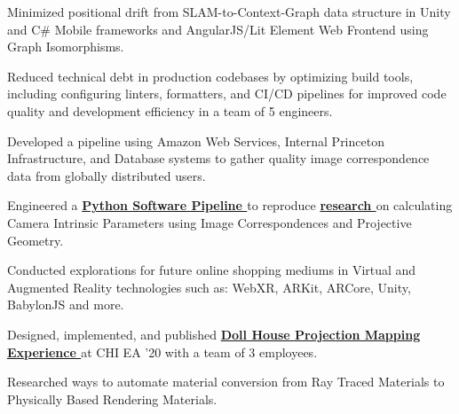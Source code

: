 \documentclass[]{plushcv}
\begin{document}
\begin{minipage}[t]{0.70\textwidth}
    \begin{tightemize}
        \item Minimized positional drift from SLAM-to-Context-Graph data structure in Unity and C\# Mobile frameworks and AngularJS/Lit Element Web Frontend using Graph Isomorphisms.
        \item Reduced technical debt in production codebases by optimizing build tools, including configuring linters, formatters, and CI/CD pipelines for improved code quality and development efficiency in a team of 5 engineers.              
    \end{tightemize}
    \sectionsep

    \begin{tightemize}
        \sectionsep
        \item Developed a pipeline using Amazon Web Services, Internal Princeton Infrastructure, and Database systems to gather quality image correspondence data from globally distributed users.
        \item Engineered a \textbf{\href{https://github.com/johanos/pollefeys-self-calibration-and-metric-reconstruction}{Python Software Pipeline }} to reproduce \textbf{\href{https://people.inf.ethz.ch/pomarc/pubs/PollefeysIJCV99.pdf}{research }} on calculating Camera Intrinsic Parameters using Image Correspondences and Projective Geometry.
    \end{tightemize}
    \sectionsep

    \begin{tightemize}
        \sectionsep
        \item Conducted explorations for future online shopping mediums in Virtual and Augmented Reality technologies such as: WebXR, ARKit, ARCore, Unity, BabylonJS and more.
        \item Designed, implemented, and published \textbf{\href{https://dl.acm.org/doi/10.1145/3334480.3383180}{Doll House Projection Mapping Experience }} at CHI EA '20 with a team of 3 employees.
        \item Researched ways to automate material conversion from Ray Traced Materials to Physically Based Rendering Materials.
    \end{tightemize}
    \sectionsep


\end{minipage}
\end{document}
